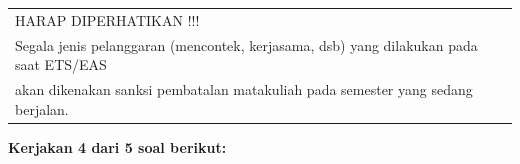 \documentclass[11pt,letterpaper]{article}
\begin{document}
\begin{table}[h!]
\begin{tabular}{r c}
    \\ \hline
    \multicolumn{2}{|l|}{\MakeUppercase{harap diperhatikan !!!}}                                                                                                                   \\
    \multicolumn{2}{|l|}{Segala jenis pelanggaran (mencontek, kerjasama, dsb) yang dilakukan pada saat ETS/EAS}                                                                    \\
    \multicolumn{2}{|l|}{akan dikenakan sanksi pembatalan matakuliah pada semester yang sedang berjalan.}                                                                          \\
    \hline
  \end{tabular}
\end{table}
\vspace*{-0.3cm}
\begin{center}
  \large\textbf{Kerjakan 4 dari 5 soal berikut:}
\end{center}
\end{document}
